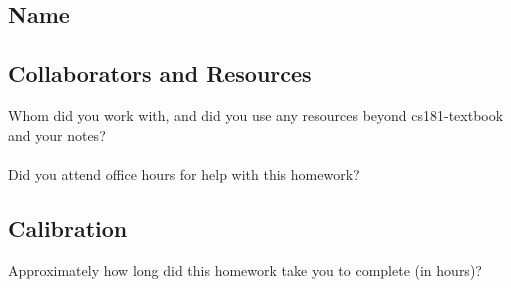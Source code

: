 \documentclass[submit]{harvardml}
\begin{document}
\newpage
\subsection*{Name}
\subsection*{Collaborators and Resources}
Whom did you work with, and did you use any resources beyond cs181-textbook and your notes?\\
\\
Did you attend office hours for help with this homework?

\subsection*{Calibration}
Approximately how long did this homework take you to complete (in hours)? 
\end{document}
